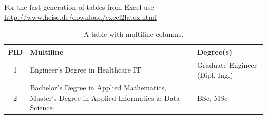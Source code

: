 For the fast generation of tables from Excel use \url{http://www.heise.de/download/excel2latex.html}

\begin{table}[ht!]
    \centering
    \caption[A table with multiline columns]{A table with multiline columns.}
    \begin{tabularx}{\textwidth}{|c|X|l|}
        \hline
        \multicolumn{1}{|c|}{\textbf{PID}} & \textbf{Multiline}                                                                            & \textbf{Degree(s)}             \\ \hline
        1                & Engineer's Degree in Healthcare IT                                                                   & Graduate Engineer (Dipl.-Ing.) \\ \hline
        2               & Bachelor's Degree in Applied Mathematics, Master's Degree in Applied Informatics \& Data Science     & BSc, MSc                       \\ \hline
    \end{tabularx}
    \label{table:multiline-table}
\end{table}

